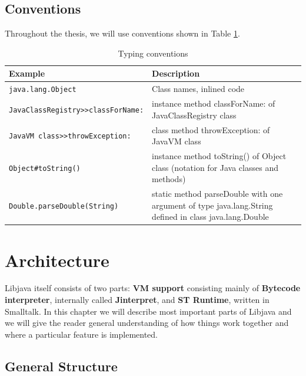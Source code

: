 \documentclass[11pt,twoside,a4paper]{book}
\let\Chapter\chapter
\def\chapter{\addtocontents{lol}{\protect\addvspace{10pt}}\Chapter}
\newcommand{\libjava}{{Libjava}}
\newcommand{\jinterpret}{Jinterpret}
\begin{document}
\section{Conventions}

Throughout the thesis, we will use conventions shown in Table \ref{tab:conventions}.

\begin{center}
	\begin{table}[ht]
		\centering
		\begin{tabular}{|l|p{7cm}|}
			\hline
			Example & Description \\
			\hline
			\hline
			\texttt{java.lang.Object} & Class names, inlined code \\
			\hline
			\texttt{JavaClassRegistry>>classForName:} & instance method classForName: of JavaClassRegistry class \\
			\hline
			\texttt{JavaVM class>>throwException:} & class method throwException: of JavaVM class \\
			\hline
			\texttt{Object\#toString()} & instance method toString() of Object class (notation for Java classes and methods) \\
			\hline
			\texttt{Double.parseDouble(String)} & static method parseDouble with one argument of type java.lang.String defined in class java.lang.Double \\
			\hline
		\end{tabular}
		\caption{Typing conventions}
		\label{tab:conventions}
	\end{table}
\end{center}


\chapter{Architecture}
\label{chap:arch}


\libjava{} itself consists of two parts: \textbf{VM support} consisting mainly of \textbf{Bytecode interpreter}, internally called \textbf{\jinterpret{}}, and \textbf{ST Runtime}, written in Smalltalk. 
In this chapter we will describe most important parts of \libjava{} and we will give the reader general understanding of how things work together and where a particular feature is implemented. 

\section{General Structure} 
\end{document}
